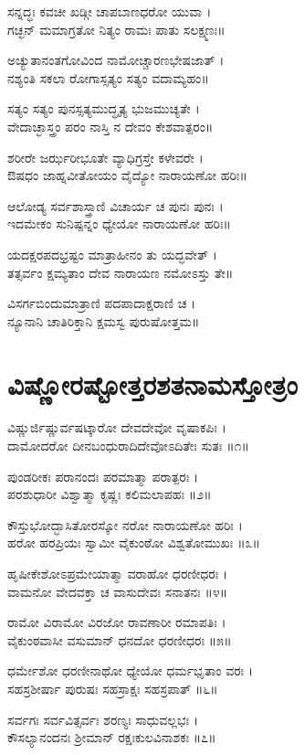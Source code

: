 ಸನ್ನದ್ಧಃ ಕವಚೀ ಖಡ್ಗೀ ಚಾಪಬಾಣಧರೋ ಯುವಾ ।\\
ಗಚ್ಛನ್ ಮಮಾಗ್ರತೋ ನಿತ್ಯಂ ರಾಮಃ ಪಾತು ಸಲಕ್ಷ್ಮಣಃ॥

ಅಚ್ಯುತಾನಂತಗೋವಿಂದ ನಾಮೋಚ್ಚಾರಣಭೇಷಜಾತ್ ।\\
ನಶ್ಯಂತಿ ಸಕಲಾ ರೋಗಾಸ್ಸತ್ಯಂ ಸತ್ಯಂ ವದಾಮ್ಯಹಂ॥

ಸತ್ಯಂ ಸತ್ಯಂ ಪುನಸ್ಸತ್ಯಮುದ್ಧೃತ್ಯ ಭುಜಮುಚ್ಯತೇ ।\\
ವೇದಾಚ್ಛಾಸ್ತ್ರಂ ಪರಂ ನಾಸ್ತಿ ನ ದೇವಂ ಕೇಶವಾತ್ಪರಂ॥

ಶರೀರೇ ಜರ್ಝರೀಭೂತೇ ವ್ಯಾಧಿಗ್ರಸ್ತೇ ಕಳೇವರೇ ।\\
ಔಷಧಂ ಜಾಹ್ನವೀತೋಯಂ ವೈದ್ಯೋ ನಾರಾಯಣೋ ಹರಿಃ॥

ಆಲೋಡ್ಯ ಸರ್ವಶಾಸ್ತ್ರಾಣಿ ವಿಚಾರ್ಯ ಚ ಪುನಃ ಪುನಃ ।\\
ಇದಮೇಕಂ ಸುನಿಷ್ಪನ್ನಂ ಧ್ಯೇಯೋ ನಾರಾಯಣೋ ಹರಿಃ॥

ಯದಕ್ಷರಪದಭ್ರಷ್ಟಂ ಮಾತ್ರಾಹೀನಂ ತು ಯದ್ಭವೇತ್ ।\\
ತತ್ಸರ್ವಂ ಕ್ಷಮ್ಯತಾಂ ದೇವ ನಾರಾಯಣ ನಮೋಽಸ್ತು ತೇ॥

ವಿಸರ್ಗಬಿಂದುಮಾತ್ರಾಣಿ ಪದಪಾದಾಕ್ಷರಾಣಿ ಚ ।\\
ನ್ಯೂನಾನಿ ಚಾತಿರಿಕ್ತಾನಿ ಕ್ಷಮಸ್ವ ಪುರುಷೋತ್ತಮ॥

\section{ವಿಷ್ಣೋರಷ್ಟೋತ್ತರಶತನಾಮಸ್ತೋತ್ರಂ}


ವಿಷ್ಣುರ್ಜಿಷ್ಣುರ್ವಷಟ್ಕಾರೋ ದೇವದೇವೋ ವೃಷಾಕಪಿಃ ।\\
ದಾಮೋದರೋ ದೀನಬಂಧುರಾದಿದೇವೋಽದಿತೇಃ ಸುತಃ ॥೧॥

ಪುಂಡರೀಕಃ ಪರಾನಂದಃ ಪರಮಾತ್ಮಾ ಪರಾತ್ಪರಃ ।\\
ಪರಶುಧಾರೀ ವಿಶ್ವಾತ್ಮಾ ಕೃಷ್ಣಃ ಕಲಿಮಲಾಪಹಃ ॥೨॥

ಕೌಸ್ತುಭೋದ್ಭಾಸಿತೋರಸ್ಕೋ ನರೋ ನಾರಾಯಣೋ ಹರಿಃ ।\\
ಹರೋ ಹರಪ್ರಿಯಃ ಸ್ವಾಮೀ ವೈಕುಂಠೋ ವಿಶ್ವತೋಮುಖಃ ॥೩॥

ಹೃಷೀಕೇಶೋಽಪ್ರಮೇಯಾತ್ಮಾ ವರಾಹೋ ಧರಣೀಧರಃ ।\\
ವಾಮನೋ ವೇದವಕ್ತಾ ಚ ವಾಸುದೇವಃ ಸನಾತನಃ ॥೪॥

ರಾಮೋ ವಿರಾಮೋ ವಿರಜೋ ರಾವಣಾರೀ ರಮಾಪತಿಃ ।\\
ವೈಕುಂಠವಾಸೀ ವಸುಮಾನ್ ಧನದೋ ಧರಣೀಧರಃ ॥೫॥

ಧರ್ಮೇಶೋ ಧರಣೀನಾಥೋ ಧ್ಯೇಯೋ ಧರ್ಮಭೃತಾಂ ವರಃ ।\\
ಸಹಸ್ರಶೀರ್ಷಾ ಪುರುಷಃ ಸಹಸ್ರಾಕ್ಷಃ ಸಹಸ್ರಪಾತ್ ॥೬॥

ಸರ್ವಗಃ ಸರ್ವವಿತ್ಸರ್ವಃ ಶರಣ್ಯಃ ಸಾಧುವಲ್ಲಭಃ ।\\
ಕೌಸಲ್ಯಾನಂದನಃ ಶ್ರೀಮಾನ್ ರಕ್ಷಃಕುಲವಿನಾಶಕಃ ॥೭॥

